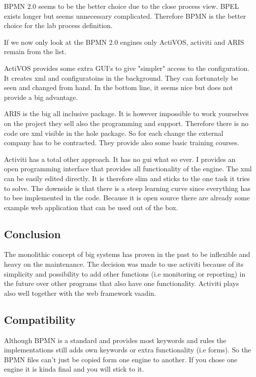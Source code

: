 \documentclass[paper=a4,twoside=false,BCOR=0mm,DIV=calc,fontsize=12pt]{scrartcl}
\begin{document}
BPMN 2.0 seems to be the better choice due to the close process view. BPEL exists longer but seems unnecessary complicated.
Therefore BPMN is the better choice for the lab process definition. 

If we now only look at the BPMN 2.0 engines only ActiVOS, activiti and ARIS remain from the list.

ActiVOS provides some extra GUI's to give "simpler" access to the configuration. It creates xml and configuratoins in the background.
They can fortunately be seen and changed from hand. In the bottom line, it seems nice but does not provide a big advantage. 

ARIS is the big all inclusive package. It is however impossible to work yourselves on the project they sell also the programming and support. Therefore there is no code ore xml visible in the hole package. So for each change the external company has to be contracted.
They provide also some basic training courses.

Activiti has a total other approach. It has no gui what so ever. I provides an open programming interface that provides all functionality 
of the engine. The xml can be easily edited directly. It is therefore slim and sticks to the one task it tries to solve.
The downside is that there is a steep learning curve since everything has to bee implemented in the code. 
Because it is open source there are already some example web application that can be used out of the box. 

\subsection{Conclusion}
The monolithic concept of big systems has proven in the past to be inflexible and heavy on the maintenance. 
The decision was made to use activiti because of its simplicity and possibility to add other functions (i.e monitoring or reporting) in the future over other programs that also have one functionality.
Activiti plays also well together with the web framework vaadin.


\subsection{Compatibility}
Although BPMN is a standard and provides most keywords and rules the implementations still adds own keywords or extra functionality (i.e
forms). So the BPMN files can't just be copied form one engine to another. If you chose one engine it is kinda final and you will stick to it.
\end{document}
